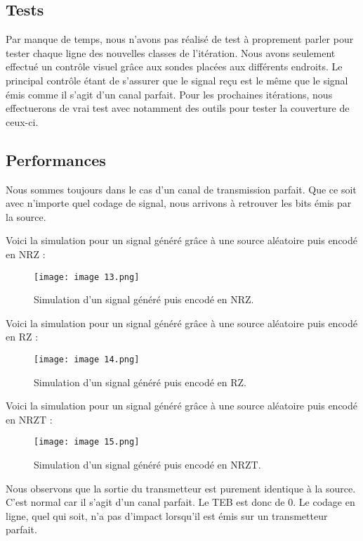 \subsection{Tests}

Par manque de temps, nous n'avons pas réalisé de test à proprement parler pour tester chaque ligne des nouvelles classes de l'itération. Nous avons seulement effectué un contrôle visuel grâce aux sondes placées aux différents endroits. Le principal contrôle étant de s'assurer que le signal reçu est le même que le signal émis comme il s'agit d'un canal parfait.
Pour les prochaines itérations, nous effectuerons de vrai test avec notamment des outils pour tester la couverture de ceux-ci.

\subsection{Performances}

Nous sommes toujours dans le cas d'un canal de transmission parfait. Que ce soit avec n'importe quel codage de signal, nous arrivons à retrouver les bits émis par la source.

Voici la simulation pour un signal généré grâce à une source aléatoire puis encodé en NRZ :

\begin{figure}[h]
    \centering
    \texttt{[image: image 13.png]}
    \caption{\label{fig:image13}Simulation d'un signal généré puis encodé en NRZ.}
\end{figure}

Voici la simulation pour un signal généré grâce à une source aléatoire puis encodé en RZ :

\begin{figure}[h]
    \centering
    \texttt{[image: image 14.png]}
    \caption{\label{fig:image14}Simulation d'un signal généré puis encodé en RZ.}
\end{figure}

Voici la simulation pour un signal généré grâce à une source aléatoire puis encodé en NRZT :

\begin{figure}[h]
    \centering
    \texttt{[image: image 15.png]}
    \caption{\label{fig:image15}Simulation d'un signal généré puis encodé en NRZT.}
\end{figure}

Nous observons que la sortie du transmetteur est purement identique à la source. C'est normal car il s'agit d'un canal parfait. Le TEB est donc de 0. Le codage en ligne, quel qui soit, n'a pas d'impact
lorsqu'il est émis sur un transmetteur parfait.

